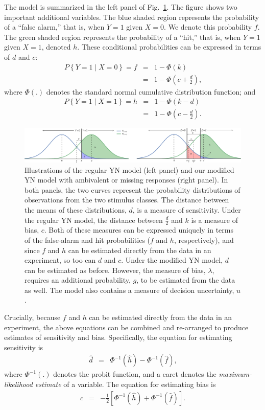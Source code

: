 \documentclass[man]{apa6}
\begin{document}
The model is summarized in the left panel of Fig.~\ref{fig:Figure1}. The figure shows two important additional variables. The blue shaded region represents the probability of a ``false alarm,'' that is, when $Y=1$ given $X=0$. We denote this probability $f$. The green shaded region represents the probability of a ``hit,'' that is, when $Y=1$ given $X=1$, denoted $h$. These conditional probabilities can be expressed in terms of $d$ and $c$:
\begin{eqnarray*}
P\left\{Y=1\mid{}X=0\right\}=f&=&1-\Phi\left(k\right)\\
&=&1-\Phi\left(c+\frac{d}{2}\right)\textrm{,}
\end{eqnarray*}where $\Phi\left(.\right)$ denotes the standard normal cumulative distribution function; and
\begin{eqnarray*}
P\left\{Y=1\mid{}X=1\right\}=h&=&1-\Phi\left(k-d\right)\\
&=&1-\Phi\left(c-\frac{d}{2}\right)\textrm{.}
\end{eqnarray*}

\begin{figure}
    \includegraphics[width=1\textwidth]{Fig1_3.pdf}
    \caption{Illustrations of the regular YN model (left panel) and our modified YN model with ambivalent or missing responses (right panel). In both panels, the two curves represent the probability distributions of observations from the two stimulus classes. The distance between the means of these distributions, $d$, is a measure of sensitivity. Under the regular YN model, the distance between $\frac{d}{2}$ and $k$ is a measure of bias, $c$. Both of these measures can be expressed uniquely in terms of the false-alarm and hit probabilities ($f$ and $h$, respectively), and since $f$ and $h$ can be estimated directly from the data in an experiment, so too can $d$ and $c$. Under the modified YN model, $d$ can be estimated as before. However, the measure of bias, $\lambda$, requires an additional probability, $g$, to be estimated from the data as well. The model also contains a measure of decision uncertainty, $u$.}
    \label{fig:Figure1}
\end{figure}

Crucially, because $f$ and $h$ can be estimated directly from the data in an experiment, the above equations can be combined and re-arranged to produce estimates of sensitivity and bias. Specifically, the equation for estimating sensitivity is
\begin{eqnarray}
\hat{d}&=&\Phi^{-1}\left(\hat{h}\right)-\Phi^{-1}\left(\hat{f}\right)\textrm{,}
\label{eq1}
\end{eqnarray}where $\Phi^{-1}\left(.\right)$ denotes the probit function, and a caret denotes the \emph{maximum-likelihood estimate} of a variable. The equation for estimating bias is
\begin{eqnarray}
\hat{c}&=&-\frac{1}{2}\left[\Phi^{-1}\left(\hat{h}\right)+\Phi^{-1}\left(\hat{f}\right)\right]\textrm{.}
\label{eq2}
\end{eqnarray}
\end{document}
